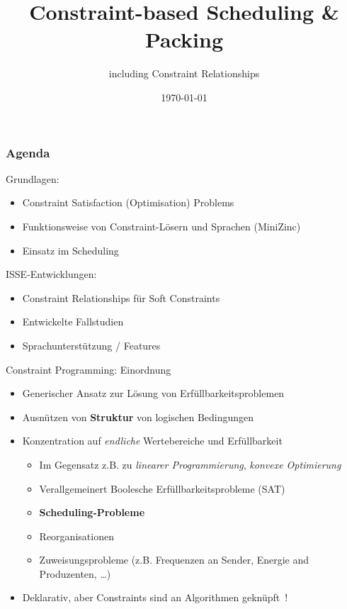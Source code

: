 \documentclass[10pt,xcolor={dvipsnames},fleqn]{beamer}
\title{Constraint-based Scheduling \& Packing}
\author{including Constraint Relationships}
\date{\today}
\begin{document}
\titleframe

\begin{frame}
    \frametitle{Agenda}
 \alert{Grundlagen:}
    \begin{itemize}
    \item Constraint Satisfaction (Optimisation) Problems
    \item Funktionsweise von Constraint-Lösern und Sprachen (MiniZinc)
    \item Einsatz im Scheduling
    \end{itemize}

    \vspace*{3ex}
    
\alert{ISSE-Entwicklungen:}
    \begin{itemize} 
    \item Constraint Relationships für Soft Constraints
    \item Entwickelte Fallstudien
    \item Sprachunterstützung / Features
     \end{itemize}
\end{frame}
\graphicspath{{img/}}

\begin{frame}{Constraint Programming: Einordnung}	
\begin{itemize}
\item Generischer Ansatz zur Lösung von \alert{Erfüllbarkeitsproblemen} 
\item Ausnützen von \textbf{Struktur} von logischen Bedingungen~\cite{tsang1993foundations}
\item Konzentration auf \emph{endliche} Wertebereiche und Erfüllbarkeit~\cite[Kap.~5]{russell2010artificial} \pause
\begin{itemize}
\item Im Gegensatz z.B. zu \emph{linearer Programmierung}, \emph{konvexe Optimierung}
\item Verallgemeinert Boolesche Erfüllbarkeitsprobleme (SAT)
\item \textbf{Scheduling-Probleme}
\item Reorganisationen
\item Zuweisungsprobleme (z.B. Frequenzen an Sender, Energie and Produzenten, \ldots)
\end{itemize} \pause
\item Deklarativ, aber Constraints sind an Algorithmen geknüpft~\cite{Rossi2006}! 
\end{itemize}
\end{frame}
\end{document}
